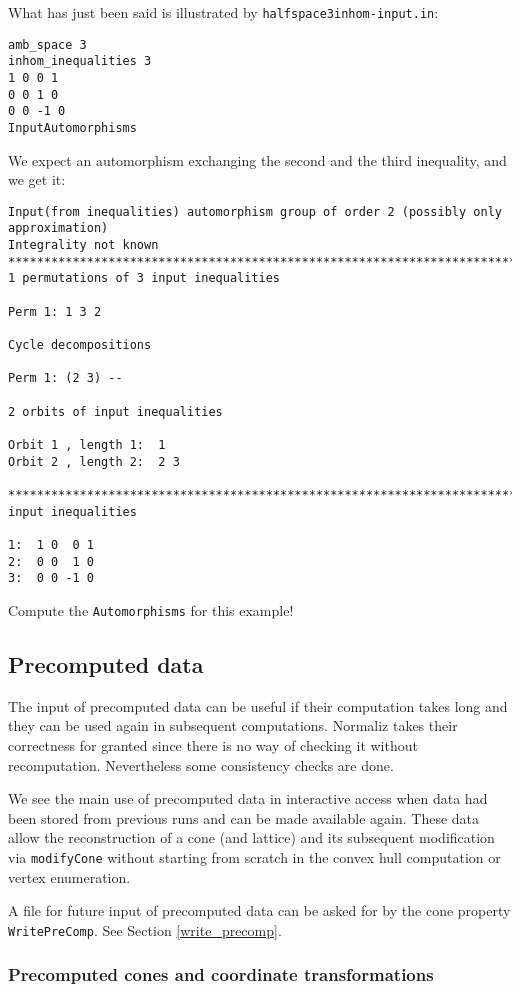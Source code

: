 What has just been said is illustrated by \verb|halfspace3inhom-input.in|:
\begin{Verbatim}
amb_space 3
inhom_inequalities 3
1 0 0 1
0 0 1 0
0 0 -1 0
InputAutomorphisms
\end{Verbatim}
We expect an automorphism exchanging the second and the third inequality, and we get it:
\begin{Verbatim}
Input(from inequalities) automorphism group of order 2 (possibly only approximation)
Integrality not known
************************************************************************
1 permutations of 3 input inequalities

Perm 1: 1 3 2

Cycle decompositions 

Perm 1: (2 3) --

2 orbits of input inequalities

Orbit 1 , length 1:  1
Orbit 2 , length 2:  2 3

************************************************************************
input inequalities

1:  1 0  0 1
2:  0 0  1 0
3:  0 0 -1 0
\end{Verbatim}

Compute the \verb|Automorphisms| for this example!

\subsection{Precomputed data}\label{precomputed_data}

The input of precomputed data can be useful if their computation takes long and they can be used again in subsequent computations. Normaliz takes their correctness for granted since there is no way of checking it without recomputation. Nevertheless some consistency checks are done.

We see the main use of precomputed data in interactive access when data had been stored from previous runs and can be made available again. These data allow the reconstruction of a cone (and lattice) and its subsequent modification via \verb|modifyCone| without starting from scratch in the convex hull computation or vertex enumeration.

A file for future input of precomputed data can be asked for by the cone property \verb|WritePreComp|. See Section \ref{write_precomp}.

\subsubsection{Precomputed cones and coordinate transformations}

